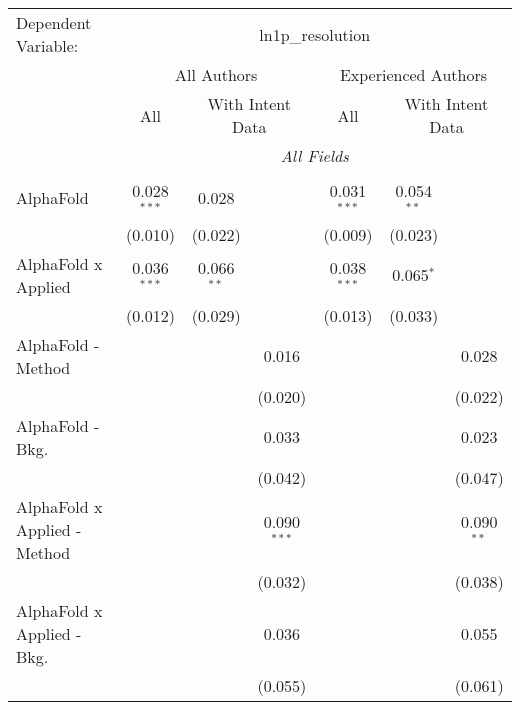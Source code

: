 \begingroup
\centering
\begin{tabular}{lcccccc}
   \tabularnewline \midrule \midrule
   Dependent Variable: & \multicolumn{6}{c}{ln1p\_resolution}\\
 & \multicolumn{3}{c}{All Authors} & \multicolumn{3}{c}{Experienced Authors} \\
\cmidrule(lr){2-4} \cmidrule(lr){5-7}
 & \multicolumn{1}{c}{All} & \multicolumn{2}{c}{With Intent Data} & \multicolumn{1}{c}{All} & \multicolumn{2}{c}{With Intent Data} \\
\cmidrule(lr){2-2} \cmidrule(lr){3-4} \cmidrule(lr){5-5} \cmidrule(lr){6-7}
 & \multicolumn{6}{c}{\textit{All Fields}} \\ \\
   AlphaFold                      & 0.028$^{***}$ & 0.028        &               & 0.031$^{***}$ & 0.054$^{**}$ &   \\   
                                  & (0.010)       & (0.022)      &               & (0.009)       & (0.023)      &   \\   
   AlphaFold x Applied            & 0.036$^{***}$ & 0.066$^{**}$ &               & 0.038$^{***}$ & 0.065$^{*}$  &   \\   
                                  & (0.012)       & (0.029)      &               & (0.013)       & (0.033)      &   \\   
   AlphaFold - Method             &               &              & 0.016         &               &              & 0.028\\   
                                  &               &              & (0.020)       &               &              & (0.022)\\   
   AlphaFold - Bkg.               &               &              & 0.033         &               &              & 0.023\\   
                                  &               &              & (0.042)       &               &              & (0.047)\\   
   AlphaFold x Applied - Method   &               &              & 0.090$^{***}$ &               &              & 0.090$^{**}$\\   
                                  &               &              & (0.032)       &               &              & (0.038)\\   
   AlphaFold x Applied - Bkg.     &               &              & 0.036         &               &              & 0.055\\   
                                  &               &              & (0.055)       &               &              & (0.061)\\   

\end{tabular}
